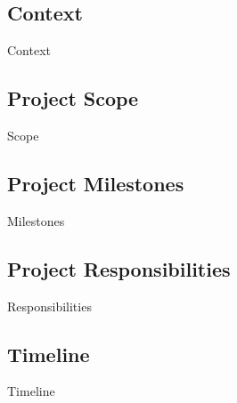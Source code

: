 \subsection{Context}
{Context}

\subsection{Project Scope}
{Scope}

\subsection{Project Milestones}
{Milestones}

\subsection{Project Responsibilities}
{Responsibilities}

\subsection{Timeline}
{Timeline}
